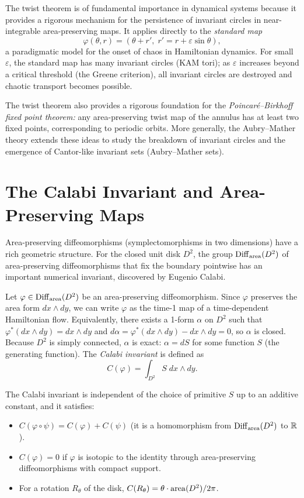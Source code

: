 The twist theorem is of fundamental importance in dynamical systems because it provides a rigorous mechanism for the persistence of invariant circles in near-integrable area-preserving maps. It applies directly to the \textit{standard map}
\[
\varphi(\theta, r) = (\theta + r',\; r' = r + \varepsilon \sin\theta),
\]
a paradigmatic model for the onset of chaos in Hamiltonian dynamics. For small $\varepsilon$, the standard map has many invariant circles (KAM tori); as $\varepsilon$ increases beyond a critical threshold (the Greene criterion), all invariant circles are destroyed and chaotic transport becomes possible.

The twist theorem also provides a rigorous foundation for the \textit{Poincar\'e--Birkhoff fixed point theorem:} any area-preserving twist map of the annulus has at least two fixed points, corresponding to periodic orbits. More generally, the Aubry--Mather theory extends these ideas to study the breakdown of invariant circles and the emergence of Cantor-like invariant sets (Aubry--Mather sets).

\section{The Calabi Invariant and Area-Preserving Maps}

Area-preserving diffeomorphisms (symplectomorphisms in two dimensions) have a rich geometric structure. For the closed unit disk $D^2$, the group $\operatorname{Diff}_{\operatorname{area}}(D^2)$ of area-preserving diffeomorphisms that fix the boundary pointwise has an important numerical invariant, discovered by Eugenio Calabi.

Let $\varphi \in \operatorname{Diff}_{\operatorname{area}}(D^2)$ be an area-preserving diffeomorphism. Since $\varphi$ preserves the area form $dx \wedge dy$, we can write $\varphi$ as the time-1 map of a time-dependent Hamiltonian flow. Equivalently, there exists a 1-form $\alpha$ on $D^2$ such that $\varphi^*(dx \wedge dy) = dx \wedge dy$ and $d\alpha = \varphi^*(dx \wedge dy) - dx \wedge dy = 0$, so $\alpha$ is closed. Because $D^2$ is simply connected, $\alpha$ is exact: $\alpha = dS$ for some function $S$ (the generating function). The \textit{Calabi invariant} is defined as
\[
C(\varphi) = \int_{D^2} S \; dx \wedge dy.
\]

The Calabi invariant is independent of the choice of primitive $S$ up to an additive constant, and it satisfies:
\begin{itemize}
\item $C(\varphi \circ \psi) = C(\varphi) + C(\psi)$ (it is a homomorphism from $\operatorname{Diff}_{\operatorname{area}}(D^2)$ to $\mathbb{R}$).
\item $C(\varphi) = 0$ if $\varphi$ is isotopic to the identity through area-preserving diffeomorphisms with compact support.
\item For a rotation $R_\theta$ of the disk, $C(R_\theta) = \theta \cdot \operatorname{area}(D^2)/2\pi$.
\end{itemize}

